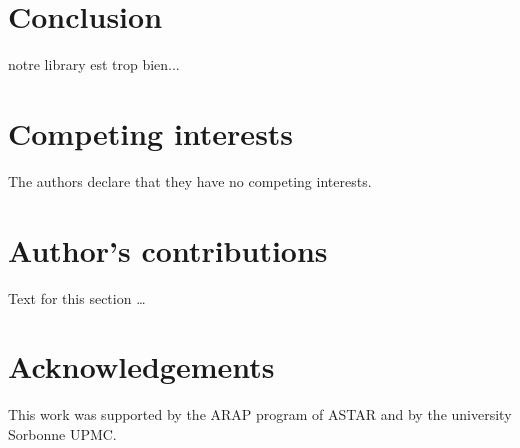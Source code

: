 \section{Conclusion}

notre library est trop bien...


\begin{backmatter}

\section*{Competing interests}
  The authors declare that they have no competing interests.

\section*{Author's contributions}
    Text for this section \ldots

\section*{Acknowledgements}
This work was supported by the ARAP program of ASTAR and by the university Sorbonne UPMC.

 
      

\end{backmatter}